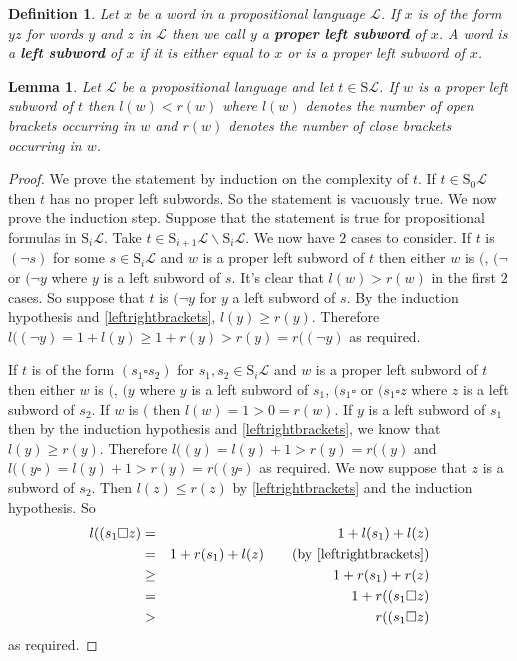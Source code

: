 \documentclass[11pt]{article}
\newcommand{\PF}{\mathrm{S}}
\newtheorem{definition}[theorem]{Definition}
\newtheorem{lemma}[theorem]{Lemma}
\newcommand{\mcal}[1]{\mathcal{#1}}
\begin{document}
\begin{definition}
Let $x$ be a word in a propositional language $\mcal{L}$.
If $x$ is of the form $yz$ for words $y$ and $z$ in $\mcal{L}$ then we call $y$ a \textbf{proper left subword} of $x$. A word is a \textbf{left subword} of $x$ if it is either equal to $x$ or is a proper left subword of $x$.
\end{definition}

\begin{lemma}\label{leftsubwords}
Let $\mcal{L}$ be a propositional language and let $t\in \PF\mcal{L}$. If $w$ is a proper left subword of $t$ then $l(w)<r(w)$ where $l(w)$ denotes the number of open brackets occurring in $w$ and $r(w)$ denotes the number of close brackets occurring in $w$.
\end{lemma}
\begin{proof}
We prove the statement by induction on the complexity of $t$. If $t\in \PF_0\mcal{L}$ then $t$ has no proper left subwords. So the statement is vacuously true. We now prove the induction step. Suppose that the statement is true for propositional formulas in $\PF_i\mcal{L}$. Take $t\in \PF_{i+1}\mcal{L}\backslash \PF_i\mcal{L}$. We now have $2$ cases to consider. If $t$ is $(\neg s)$ for some $s\in \PF_i\mcal{L}$ and $w$ is a proper left subword of $t$ then either $w$ is $($, $(\neg$ or $(\neg y$ where $y$ is a left subword of $s$. It's clear that $l(w)>r(w)$ in the first $2$ cases. So suppose that $t$ is $(\neg y$ for $y$ a left subword of $s$. By the induction hypothesis and \ref{leftrightbrackets}, $l(y)\geq r(y)$. Therefore $l((\neg y)=1+l(y)\geq 1+r(y)>r(y)=r((\neg y)$ as required.

If $t$ is of the form $(s_1\square s_2)$ for $s_1,s_2\in \PF_i\mcal{L}$ and $w$ is a proper left subword of $t$ then either $w$ is $($, $(y$ where $y$ is a left subword of $s_1$, $(s_1\square$ or $(s_1\square z$ where $z$ is a  left subword of $s_2$. If $w$ is $($ then $l(w)=1>0=r(w)$. If $y$ is a left subword of $s_1$ then by the induction hypothesis and \ref{leftrightbrackets}, we know that $l(y)\geq r(y)$. Therefore $l((y)=l(y)+1>r(y)=r((y)$ and $l((y\square)=l(y)+1>r(y)=r((y\square)$ as required. We now suppose that $z$ is a subword of $s_2$. Then $l(z)\leq r(z)$ by \ref{leftrightbrackets} and the induction hypothesis. So
\begin{eqnarray*}
  l((s_1\square z) &=& 1+l(s_1)+l(z) \\
   &=& 1+ r(s_1)+l(z) \qquad \text{(by \ref{leftrightbrackets})}\\
   &\geq& 1 + r(s_1)+r(z) \\
   &=& 1+ r((s_1\square z) \\
   &>& r((s_1\square z)
\end{eqnarray*} as required.
\end{proof}
\end{document}
